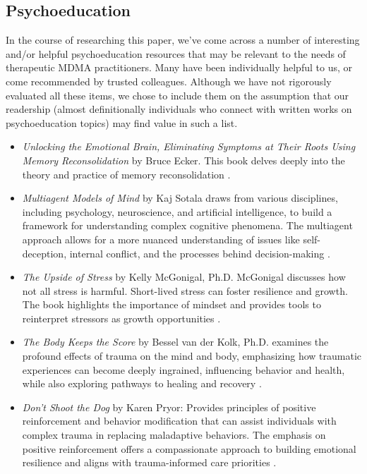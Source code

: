 \documentclass[12pt,letterpaper]{article}
\begin{document}
\subsection{Psychoeducation}
\label{sec:psychoeducation}
In the course of researching this paper, we've come across a number of interesting and/or helpful psychoeducation resources that may be relevant to the needs of therapeutic MDMA practitioners. Many have been individually helpful to us, or come recommended by trusted colleagues. Although we have not rigorously evaluated all these items, we chose to include them on the assumption that our readership (almost definitionally individuals who connect with written works on psychoeducation topics) may find value in such a list.
\label{resources}
\begin{itemize}
    \item \textit{Unlocking the Emotional Brain, Eliminating Symptoms at Their Roots Using Memory Reconsolidation} by Bruce Ecker. This book delves deeply into the theory and practice of memory reconsolidation \cite{eckerUnlocking}.
    \item \textit{Multiagent Models of Mind} by Kaj Sotala draws from various disciplines, including psychology, neuroscience, and artificial intelligence, to build a framework for understanding complex cognitive phenomena. The multiagent approach allows for a more nuanced understanding of issues like self-deception, internal conflict, and the processes behind decision-making \cite{sotalaMultiagent}.
    \item \textit{The Upside of Stress} by Kelly McGonigal, Ph.D. McGonigal discusses how not all stress is harmful. Short-lived stress can foster resilience and growth. The book highlights the importance of mindset and provides tools to reinterpret stressors as growth opportunities \cite{mcgonigalStress}.
    \item \textit{The Body Keeps the Score} by Bessel van der Kolk, Ph.D. examines the profound effects of trauma on the mind and body, emphasizing how traumatic experiences can become deeply ingrained, influencing behavior and health, while also exploring pathways to healing and recovery \cite{vanderKolkBody}. 
    \item \textit{Don't Shoot the Dog} by Karen Pryor: Provides principles of positive reinforcement and behavior modification that can assist individuals with complex trauma in replacing maladaptive behaviors. The emphasis on positive reinforcement offers a compassionate approach to building emotional resilience and aligns with trauma-informed care priorities \cite{pryorDog}.

\end{itemize}
\end{document}
